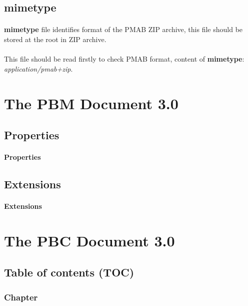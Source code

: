 \documentclass{article}
\begin{document}
		\subsection{mimetype}
			\paragraph{} \textbf{mimetype} file identifies format of the PMAB ZIP archive, this file should be stored at the root in ZIP archive.
			\paragraph{} This file should be read firstly to check PMAB format, content of \textbf{mimetype}: \textit{application/pmab+zip}.
	\section{The PBM Document 3.0}
		\subsection{Properties}
			\paragraph{} \textbf{Properties}
		\subsection{Extensions}
			\paragraph{} \textbf{Extensions}
	\section{The PBC Document 3.0}
		\subsection{Table of contents (TOC)}
		\subsubsection{Chapter}
\end{document}
